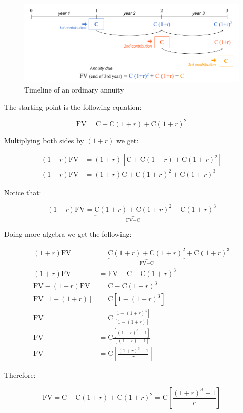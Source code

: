 \documentclass[
]{book}
\begin{document}
\begin{figure}

{\centering \includegraphics[width=0.95\linewidth]{images/conditionals/timeline-ord-annuity-2} 

}

\caption{Timeline of an ordinary annuity}\label{fig:unnamed-chunk-227}
\end{figure}

The starting point is the following equation:

\[
\text{FV} = \text{C} + \text{C} (1 + r) + \text{C} (1 + r)^2
\]

Multiplying both sides by \((1+r)\) we get:

\begin{align*}
(1+r) \text{FV} &= (1+r) \left[ \text{C} + \text{C} (1 + r) + \text{C} (1 + r)^2 \right] \\
(1+r) \text{FV} &= (1+r) \text{C} + \text{C} (1 + r)^2 + \text{C} (1 + r)^3
\end{align*}

Notice that:

\[
(1+r) \text{FV} = \underbrace{\text{C} (1 + r) + \text{C} (1 + r)^2}_{\text{FV} - \text{C}}  + \text{C} (1 + r)^3
\]

Doing more algebra we get the following:

\begin{align*}
(1+r) \text{FV} &= \underbrace{\text{C} (1 + r) + \text{C} (1 + r)^2}_{\text{FV} - \text{C}}  + \text{C} (1 + r)^3 \\
(1+r) \text{FV} &= \text{FV} - \text{C} + \text{C} (1 + r)^3 \\
\text{FV} - (1+r) \text{FV} &= \text{C} - \text{C}(1+r)^3 \\
\text{FV} \left[ 1 - (1+r)  \right] &= \text{C} \left[ 1 - (1+r)^3 \right] \\
\text{FV} &= \text{C} \frac{ \left[ 1 - (1+r)^3 \right]}{ \left[ 1 - (1+r) \right]} \\
\text{FV} &= \text{C} \frac{ \left[ (1+r)^3 -1 \right]}{ \left[ (1+r) -1 \right]} \\
\text{FV} &= \text{C} \left[ \frac{(1+r)^3 -1}{r} \right]
\end{align*}

Therefore:

\[
\text{FV} = \text{C} + \text{C} (1 + r) + \text{C} (1 + r)^2 = \text{C} \left[ \frac{(1+r)^3 -1}{r} \right]
\]

  
\end{document}
